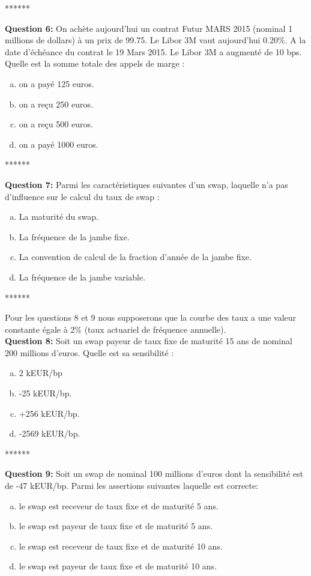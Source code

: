 \documentclass{article}
\newcommand{\indentitem}{\setlength\itemindent{25pt}}
\begin{document}
\smallskip
\centerline{******}
\smallskip
\textbf{Question 6:}
On achète aujourd’hui un contrat Futur MARS 2015  (nominal 1 millions de dollars) à un prix de 99.75. Le Libor 3M vaut aujourd’hui 0.20\%. A la date d’échéance du contrat le 19 Mars 2015. Le Libor 3M a augmenté de 10 bps. Quelle est la somme totale des appels de marge :
\begin{enumerate}[a)]
\indentitem \item on a payé 125 euros.
\indentitem \item on a reçu 250 euros.
\indentitem \item on a reçu 500 euros.
\indentitem \item on a payé 1000 euros.
\end{enumerate}
\newpage
\smallskip
\centerline{******}
\smallskip
\textbf{Question 7:} Parmi les caractéristiques suivantes d’un swap, laquelle n’a pas d’influence sur le calcul du taux de swap :
\begin{enumerate}[a)]
\indentitem \item La maturité du swap.
\indentitem \item La fréquence de la jambe fixe.
\indentitem \item La convention de calcul de la fraction d’année de la jambe fixe.
\indentitem \item La fréquence de la jambe variable.
\end{enumerate}
\smallskip
\centerline{******}
\smallskip
Pour les questions 8 et 9 nous supposerons que la courbe des taux a une valeur constante égale à 2\% (taux actuariel de fréquence annuelle).
\smallskip\\
\textbf{Question 8:} Soit un swap payeur de taux fixe de maturité 15 ans de nominal 200 millions d’euros. Quelle est sa sensibilité :
\begin{enumerate}[a)]
\indentitem \item 2 kEUR/bp
\indentitem \item -25 kEUR/bp.
\indentitem \item +256 kEUR/bp.
\indentitem \item -2569 kEUR/bp.
\end{enumerate}
\smallskip
\centerline{******}
\smallskip
\textbf{Question 9:}
Soit un swap de nominal 100 millions d’euros dont la sensibilité est de -47 kEUR/bp. Parmi les assertions suivantes laquelle est correcte:
\begin{enumerate}[a)]
\indentitem \item le swap est receveur de taux fixe et de maturité 5 ans.
\indentitem \item le swap est payeur de taux fixe et de maturité 5 ans.
\indentitem \item le swap est receveur de taux fixe et de maturité 10 ans.
\indentitem \item le swap est payeur de taux fixe et de maturité 10 ans.
\end{enumerate}
\end{document}
